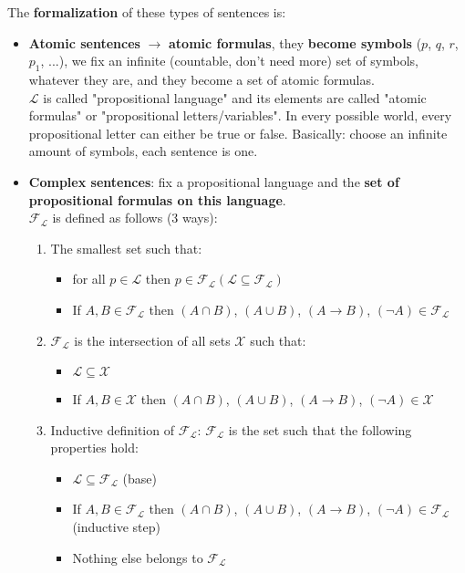 \documentclass[11pt]{article}
\begin{document}
	The \textbf{formalization} of these types of sentences is:
	\begin{itemize}
		\item \textbf{Atomic sentences} $\rightarrow$ \textbf{atomic formulas}, they \textbf{become symbols} ($p$, $q$, $r$, $p_1$, ...), we fix an infinite (countable, don't need more) set of symbols, whatever they are, and they become a set of atomic formulas. \\
		
		$\mathcal{L}$ is called "propositional language" and its elements are called "atomic formulas" or "propositional letters/variables". In every possible world, every propositional letter can either be true or false. Basically: choose an infinite amount of symbols, each sentence is one.\\
		
		\item \textbf{Complex sentences}: fix a propositional language and the \textbf{set of propositional formulas on this language}.\\ $\mathcal{F}_\mathcal{L}$ is defined as follows (3 ways):
		\begin{enumerate}
			\item The smallest set such that: 
			\begin{itemize}
				\item for all $p \in \mathcal{L}$ then $p \in \mathcal{F}_\mathcal{L} (\mathcal{L} \subseteq \mathcal{F}_\mathcal{L})$
				\item If $A, B \in \mathcal{F}_\mathcal{L}$ then $(A \cap B)$, $(A \cup B)$, $(A \rightarrow B)$, $(\neg A) \in \mathcal{F}_\mathcal{L}$
			\end{itemize}
			
			\item $\mathcal{F}_\mathcal{L}$ is the intersection of all sets $\mathcal{X}$ such that:
			\begin{itemize}
				\item $\mathcal{L} \subseteq \mathcal{X}$
				\item If $A,B \in \mathcal{X}$ then $(A \cap B)$, $(A \cup B)$, $(A \rightarrow B)$, $(\neg A) \in \mathcal{X}$
			\end{itemize}

			\item Inductive definition of $\mathcal{F}_\mathcal{L}$: $\mathcal{F}_\mathcal{L}$ is the set such that the following properties hold: 
			\begin{itemize}
				\item $\mathcal{L} \subseteq \mathcal{F}_\mathcal{L}$ (base)
				\item If $A, B \in \mathcal{F}_\mathcal{L}$ then $(A \cap B)$, $(A \cup B)$, $(A \rightarrow B)$, $(\neg A) \in \mathcal{F}_\mathcal{L}$ (inductive step)
				\item Nothing else belongs to $\mathcal{F}_\mathcal{L}$
			\end{itemize}
		\end{enumerate}
		

\end{itemize}
\end{document}
